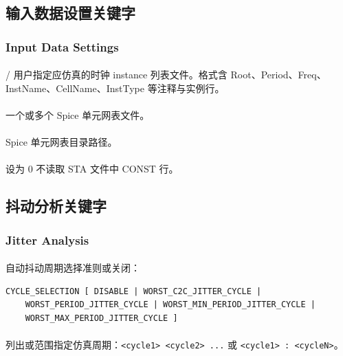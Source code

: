 \subsection{输入数据设置关键字}
\subsubsection*{Input Data Settings}

\paragraph{} / 
用户指定应仿真的时钟 instance 列表文件。格式含 Root、Period、Freq、InstName、CellName、InstType 等注释与实例行。

\paragraph{}
一个或多个 Spice 单元网表文件。

\paragraph{}
Spice 单元网表目录路径。

\paragraph{}
设为 0 不读取 STA 文件中 CONST 行。

\subsection{抖动分析关键字}
\subsubsection*{Jitter Analysis}

\paragraph{}
自动抖动周期选择准则或关闭：
\begin{lstlisting}
CYCLE_SELECTION [ DISABLE | WORST_C2C_JITTER_CYCLE |
    WORST_PERIOD_JITTER_CYCLE | WORST_MIN_PERIOD_JITTER_CYCLE |
    WORST_MAX_PERIOD_JITTER_CYCLE ]
\end{lstlisting}

\paragraph{}
列出或范围指定仿真周期：\texttt{<cycle1> <cycle2> ...} 或 \texttt{<cycle1> : <cycleN>}。


